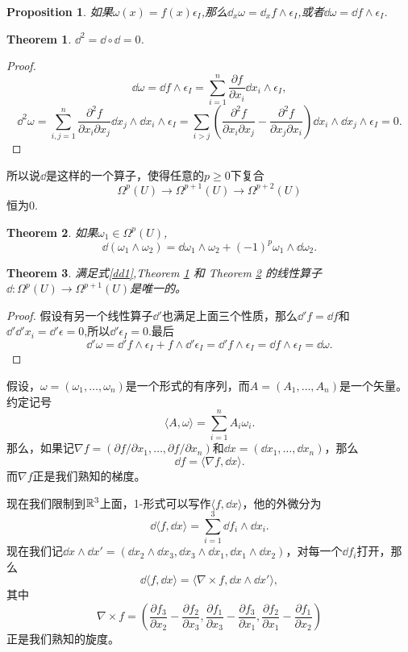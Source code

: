 \documentclass[11pt]{extbook}
\theoremstyle{plain}%
\newtheorem{pro}{Proposition}[section]%
\newtheorem{theo}{Theorem}[section]%
\begin{document}
\begin{pro}
如果$\omega(x)=f(x)\epsilon_I$,那么$\dd_x \omega=\dd_x f\wedge \epsilon_I$,或者$\dd \omega=\dd f\wedge \epsilon_I$.
\end{pro}
\begin{theo}
\label{dd2}
$\dd^2=\dd \circ \dd=0$.
\end{theo}
\begin{proof}
\[
\dd \omega =\dd f\wedge \epsilon_I=\sum_{i=1}^n\frac{\partial f}{\partial x_i}\dd x_i\wedge \epsilon_I,
\]
\[
\dd^2 \omega=\sum_{i,j=1}^n\frac{\partial^2 f}{\partial x_i\partial x_j}\dd x_j \wedge \dd x_i\wedge \epsilon_I=\sum_{i>j}\left(\frac{\partial^2 f}{\partial x_i\partial x_j}-\frac{\partial^2 f}{\partial x_j\partial x_i}\right)\dd x_i \wedge \dd x_j\wedge \epsilon_I=0.
\]
\end{proof}
所以说$\dd$是这样的一个算子，使得任意的$p\geq 0$下复合
\[
\Omega^p(U)\to\Omega^{p+1}(U)\to\Omega^{p+2}(U)
\]
恒为0.
\begin{theo}\label{dd3}
如果$\omega_1\in\Omega^p(U)$,
\[
\dd\left(\omega_1\wedge \omega_2\right)=\dd\omega_1\wedge \omega_2+(-1)^p\omega_1\wedge \dd\omega_2.
\]
\end{theo}
\begin{theo}满足式\eqref{dd1},{\rm Theorem \ref{dd2}} 和 {\rm Theorem \ref{dd3}} 的线性算子$\dd:\Omega^p(U)\to\Omega^{p+1}(U)$是唯一的。
\end{theo}
\begin{proof}
假设有另一个线性算子$\dd'$也满足上面三个性质，那么$\dd'f=\dd f$和$\dd' \dd' x_i=\dd'\epsilon=0$,所以$\dd' \epsilon_I=0$.最后
\[
\dd' \omega= \dd' f\wedge \epsilon_I+f\wedge \dd'\epsilon_I= \dd' f\wedge \epsilon_I= \dd f\wedge \epsilon_I=\dd \omega.
\]
\end{proof}
假设，$\omega=(\omega_1,\dots,\omega_n)$是一个形式的有序列，而$A=(A_1,\dots,A_n)$是一个矢量。约定记号
\[
\langle A, \omega \rangle=\sum_{i=1}^n A_i \omega_i.
\]
那么，如果记$\nabla f=(\partial f/\partial x_1,\dots,\partial f/\partial x_n)$和$\dd x =(\dd x_1,\dots,\dd x_n)$，那么
\[
\dd f = \langle \nabla f, \dd x \rangle.
\]
而$\nabla f$正是我们熟知的梯度。

现在我们限制到$\mathbb{R}^3$上面，1-形式可以写作$\langle f, \dd x \rangle$，他的外微分为
\[
\dd\langle f, \dd x \rangle=\sum_{i=1}^3\dd f_i\wedge \dd x_i.
\]
现在我们记$\dd x \wedge \dd x' =(\dd x_2 \wedge \dd x_3,\dd x_3 \wedge \dd x_1,\dd x_1 \wedge \dd x_2)$，对每一个$\dd f_i$打开，那么
\[
\dd\langle f, \dd x \rangle=\langle \nabla\times f, \dd x \wedge \dd x'  \rangle,
\]
其中
\[
\nabla\times f=\left(\frac{\partial f_3}{\partial x_2}-\frac{\partial f_2}{\partial x_3},\frac{\partial f_1}{\partial x_3}-\frac{\partial f_3}{\partial x_1},\frac{\partial f_2}{\partial x_1}-\frac{\partial f_1}{\partial x_2}\right)
\]
正是我们熟知的旋度。
\end{document}
